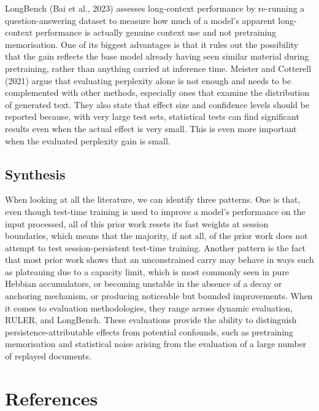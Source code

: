 \documentclass[12pt,a4paper]{article}
\begin{document}
LongBench (Bai et al., 2023) assesses long-context performance by re-running a question-answering dataset to measure how much of a model's apparent long-context performance is actually genuine context use and not pretraining memorisation. One of its biggest advantages is that it rules out the possibility that the gain reflects the base model already having seen similar material during pretraining, rather than anything carried at inference time. Meister and Cotterell (2021) argue that evaluating perplexity alone is not enough and needs to be complemented with other methods, especially ones that examine the distribution of generated text. They also state that effect size and confidence levels should be reported because, with very large test sets, statistical tests can find significant results even when the actual effect is very small. This is even more important when the evaluated perplexity gain is small.

\subsection*{Synthesis}

When looking at all the literature, we can identify three patterns. One is that, even though test-time training is used to improve a model's performance on the input processed, all of this prior work resets its fast weights at session boundaries, which means that the majority, if not all, of the prior work does not attempt to test session-persistent test-time training. Another pattern is the fact that most prior work shows that an unconstrained carry may behave in ways such as plateauing due to a capacity limit, which is most commonly seen in pure Hebbian accumulators, or becoming unstable in the absence of a decay or anchoring mechanism, or producing noticeable but bounded improvements. When it comes to evaluation methodologies, they range across dynamic evaluation, RULER, and LongBench. These evaluations provide the ability to distinguish persistence-attributable effects from potential confounds, such as pretraining memorisation and statistical noise arising from the evaluation of a large number of replayed documents.

\newpage
\section*{References}

\end{document}
